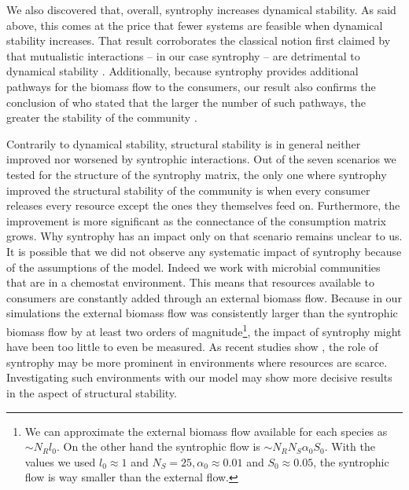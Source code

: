\documentclass[12pt, titlepage]{report}
\begin{document}
We also discovered that, overall, syntrophy increases dynamical stability. As said above, this comes at the price that fewer systems are feasible when dynamical stability increases. That result corroborates the classical notion first claimed by \citeauthor{may_qualitative_1973} that mutualistic interactions -- in our case syntrophy -- are detrimental to dynamical stability \cite{may_qualitative_1973}. Additionally, because syntrophy provides additional pathways for the biomass flow to the consumers, our result also confirms the conclusion of \citeauthor{macarthur_fluctuations_1955} who stated that the larger the number of such pathways, the greater the stability of the community \cite{macarthur_fluctuations_1955}.

Contrarily to dynamical stability, structural stability is in general neither improved nor worsened by syntrophic interactions. Out of the seven scenarios we tested for the structure of the syntrophy matrix, the only one where syntrophy improved the structural stability of the community is when every consumer releases every resource except the ones they themselves feed on. Furthermore, the improvement is more significant as the connectance of the consumption matrix grows. Why syntrophy has an impact only on that scenario remains unclear to us. It is possible that we did not observe any systematic impact of syntrophy because of the assumptions of the model. Indeed we work with microbial communities that are in a chemostat environment. This means that resources available to consumers are constantly added through an external biomass flow. Because in our simulations the external biomass flow was consistently larger than the syntrophic biomass flow by at least two orders of magnitude\footnote{We can approximate the external biomass flow available for each species as $ \sim N_R l_0$. On the other hand the syntrophic flow is $\sim N_R N_S \alpha_0 S_0$. With the values we used $l_0 \approx 1$ and $N_S=25, \alpha_0 \approx 0.01$ and $S_0 \approx 0.05$, the syntrophic flow is way smaller than the external flow.}, the impact of syntrophy might have been too little to even be measured. As recent studies show \cite{pacheco_costless_2019}, the role of syntrophy may be more prominent in environments where resources are scarce. Investigating such environments with our model may show more decisive results in the aspect of structural stability.
\end{document}
